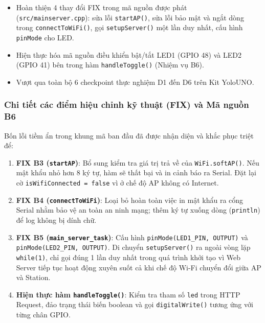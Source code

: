 \begin{tcolorbox}[
    enhanced, colback=black!2, colframe=black!60, boxrule=1pt, arc=2.5mm, drop shadow,
    attach boxed title to top left={xshift=4mm, yshift=-3mm},
    boxed title style={enhanced, colback=black!85, colframe=black!85, boxrule=1pt, arc=2.5mm, drop shadow, left=6pt, right=6pt, top=2pt, bottom=2pt},
    title=\textcolor{white}{\large\textbf{Mục tiêu và Nhiệm vụ Bài tập 0}}
]
\bfseries
\vspace{0.2cm}
\begin{itemize}
    \item Hoàn thiện 4 thay đổi FIX trong mã nguồn được phát (\texttt{src/mainserver.cpp}): sửa lỗi \texttt{startAP()}, sửa lỗi bảo mật và ngắt dòng trong \texttt{connectToWiFi()}, gọi \texttt{setupServer()} một lần duy nhất, cấu hình \texttt{pinMode} cho LED.
    \item Hiện thực hóa mã nguồn điều khiển bật/tắt LED1 (GPIO 48) và LED2 (GPIO 41) bên trong hàm \texttt{handleToggle()} (Nhiệm vụ B6).
    \item Vượt qua toàn bộ 6 checkpoint thực nghiệm D1 đến D6 trên Kit YoloUNO.
\end{itemize}
\end{tcolorbox}

\subsubsection{Chi tiết các điểm hiệu chỉnh kỹ thuật (FIX) và Mã nguồn B6}
Bốn lỗi tiềm ẩn trong khung mã ban đầu đã được nhận diện và khắc phục triệt để:
\begin{enumerate}
    \item \textbf{FIX B3 (\texttt{startAP})}: Bổ sung kiểm tra giá trị trả về của \texttt{WiFi.softAP()}. Nếu mật khẩu nhỏ hơn 8 ký tự, hàm sẽ thất bại và in cảnh báo ra Serial. Đặt lại cờ \texttt{isWifiConnected = false} vì ở chế độ AP không có Internet.
    \item \textbf{FIX B4 (\texttt{connectToWiFi})}: Loại bỏ hoàn toàn việc in mật khẩu ra cổng Serial nhằm bảo vệ an toàn an ninh mạng; thêm ký tự xuống dòng (\texttt{println}) để log không bị dính chữ.
    \item \textbf{FIX B5 (\texttt{main\_server\_task})}: Cấu hình \texttt{pinMode(LED1\_PIN, OUTPUT)} và \texttt{pinMode(LED2\_PIN, OUTPUT)}. Di chuyển \texttt{setupServer()} ra ngoài vòng lặp \texttt{while(1)}, chỉ gọi đúng 1 lần duy nhất trong quá trình khởi tạo vì Web Server tiếp tục hoạt động xuyên suốt cả khi chế độ Wi-Fi chuyển đổi giữa AP và Station.
    \item \textbf{Hiện thực hàm \texttt{handleToggle()}}: Kiểm tra tham số \texttt{led} trong HTTP Request, đảo trạng thái biến boolean và gọi \texttt{digitalWrite()} tương ứng với từng chân GPIO.
\end{enumerate}

